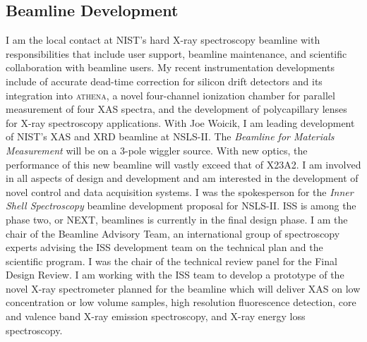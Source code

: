 \documentclass[11pt]{moderncv}
\begin{document}
\subsection{Beamline Development}
%
{I am the local contact at NIST's hard X-ray spectroscopy beamline
  with responsibilities that include user support, beamline
  maintenance, and scientific collaboration with beamline users.  My
  recent instrumentation developments include of accurate dead-time
  correction for silicon drift detectors and its integration into
  \textsc{athena}, a novel four-channel ionization chamber for
  parallel measurement of four XAS spectra, and the development of
  polycapillary lenses for X-ray spectroscopy applications.}
%
%
{With Joe Woicik, I am leading development of NIST's XAS and XRD
  beamline at NSLS-II.  The \textit{Beamline for Materials
    Measurement} will be on a 3-pole wiggler source.  With new optics,
  the performance of this new beamline will vastly exceed that of
  X23A2.  I am involved in all aspects of design and development and
  am interested in the development of novel control and data
  acquisition systems.}
%
%
{I was the spokesperson for the \textit{Inner Shell Spectroscopy}
  beamline development proposal for NSLS-II.  ISS is among the phase
  two, or NEXT, beamlines is currently in the final design phase.  I
  am the chair of the Beamline Advisory Team, an international group
  of spectroscopy experts advising the ISS development team on the
  technical plan and the scientific program.  I was the chair of
  the technical review panel for the Final Design Review.  I am
  working with the ISS team to develop a prototype of the novel X-ray
  spectrometer planned for the beamline which will deliver XAS on low
  concentration or low volume samples, high resolution fluorescence
  detection, core and valence band X-ray emission spectroscopy, and
  X-ray energy loss spectroscopy.}


\end{document}
